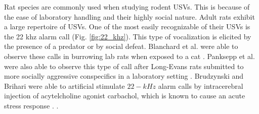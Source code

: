 \documentclass[12pt, letter]{report}
\begin{document}
Rat species are commonly used when studying rodent USVs. This is because of the ease of laboratory handling and their highly social nature. Adult rats exhibit a large repertoire of USVs. One of the most easily recognizable of their USVs is the 22 khz alarm call (Fig. \ref{fig:22_khz}). This type of vocalization is elicited by the presence of a predator or by social defeat. Blanchard et al. were able to observe these calls in burrowing lab rats when exposed to a cat \cite{Blanchard1991}. Panksepp et al. were also able to observe this type of call after Long-Evans rats submitted to more socially aggressive conspecifics in a laboratory setting \cite{Panksepp2007}. Brudzynski and Brihari were able to artificial stimulate $22-kHz$ alarm calls by intracerebral injection of acytelcholine agonist carbachol, which is known to cause an acute stress response \cite{Brudzynski1990}. \cite{Burgdorf2010}. 
\end{document}
